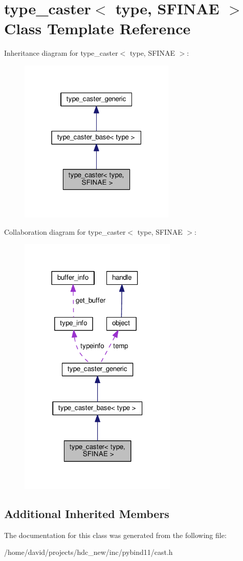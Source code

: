 \hypertarget{classtype__caster}{}\section{type\+\_\+caster$<$ type, S\+F\+I\+N\+AE $>$ Class Template Reference}
\label{classtype__caster}


Inheritance diagram for type\+\_\+caster$<$ type, S\+F\+I\+N\+AE $>$\+:
\nopagebreak
\begin{figure}[H]
\begin{center}
\leavevmode
\includegraphics[width=211pt]{classtype__caster__inherit__graph}
\end{center}
\end{figure}


Collaboration diagram for type\+\_\+caster$<$ type, S\+F\+I\+N\+AE $>$\+:
\nopagebreak
\begin{figure}[H]
\begin{center}
\leavevmode
\includegraphics[width=213pt]{classtype__caster__coll__graph}
\end{center}
\end{figure}
\subsection*{Additional Inherited Members}


The documentation for this class was generated from the following file\+:\begin{DoxyCompactItemize}
\item 
/home/david/projects/hdc\+\_\+new/inc/pybind11/cast.\+h\end{DoxyCompactItemize}
